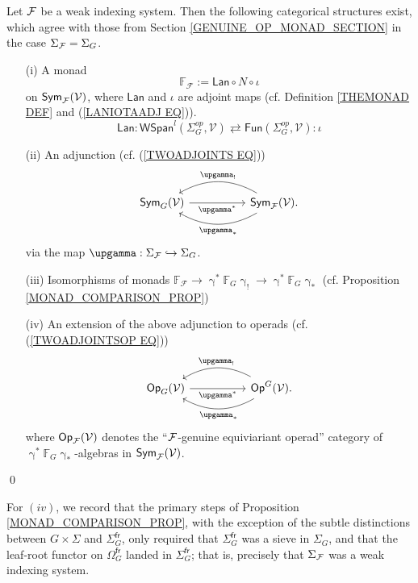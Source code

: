 \documentclass[a4paper,10pt]{article}%
\begin{document}
\begin{corollary} 
  Let $\mathcal F$ be a weak indexing system. Then the following categorical structures exist, which agree with those from Section \ref{GENUINE_OP_MONAD_SECTION} in the case $\Sigma_{\mathcal F} = \Sigma_G$. 
  \begin{enumerate}
  \item[(i)]  A monad 
    \[
    \mathbb F_{\mathcal F} := \mathsf{Lan} \circ N \circ \iota
    \]
    on $\mathsf{Sym}_{\mathcal F}(\mathcal V)$, where $\mathsf{Lan}$ and $\iota$ are adjoint maps (cf. Definition \ref{THEMONAD DEF} and (\ref{LANIOTAADJ EQ})).
    \[    
    \mathsf{Lan} \colon
    \mathsf{WSpan}^l(\Sigma^{op}_G, \mathcal{V})
    \rightleftarrows
    \mathsf{Fun}(\Sigma^{op}_G, \mathcal{V})
    \colon \iota
    \]
  \item[(ii)] An adjunction (cf. (\ref{TWOADJOINTS EQ}))
    \[
    \begin{tikzcd}[column sep =5em]
      \mathsf{Sym}_G(\mathcal{V}) \ar{r}[swap]{\upgamma^{\**}} 
      &
      \mathsf{Sym}_{\mathcal F}(\mathcal{V})
      \ar[bend right]{l}[swap,midway]{\upgamma_{!}}
      \ar[bend left]{l}{\upgamma_{\**}}.
    \end{tikzcd}
    \]
    via the map $\upgamma: \Sigma_\F \into \Sigma_G$.
\item[(iii)] Isomorphisms of monads $\mathbb F_{\mathcal F} \to \upgamma^* \mathbb F_G \upgamma_! \to \upgamma^* \mathbb F_G \upgamma_*$ (cf. Proposition \ref{MONAD_COMPARISON_PROP})

\item[(iv)] An extension of the above adjunction to operads (cf. (\ref{TWOADJOINTSOP EQ}))
  \[
  \begin{tikzcd}[column sep =5em]
    \mathsf{Op}_G(\mathcal{V}) \ar{r}[swap]{\upgamma^{\**}} 
    &
    \mathsf{Op}^G(\mathcal{V})
    \ar[bend right]{l}[swap,midway]{\upgamma_{!}}
    \ar[bend left]{l}{\upgamma_{\**}}.
  \end{tikzcd}
  \]
where $\mathsf{Op}_{\mathcal F}(\mathcal V)$ denotes the ``$\mathcal F$-genuine equiviariant operad'' category of\ $\upgamma^* \mathbb F_G \upgamma_*$-algebras in $\mathsf{Sym}_{\mathcal F}(\mathcal V)$.
\end{enumerate} \qed
\end{corollary}

\begin{remark}
  For $(iv)$, we record that the primary steps of Proposition \ref{MONAD_COMPARISON_PROP}, with the exception of the subtle distinctions between $G\times \Sigma$ and $\Sigma_G^{\mathsf{fr}}$, only required that $\Sigma_G^{\mathsf{fr}}$ was a sieve in $\Sigma_G$, and that the leaf-root functor on $\Omega_G^{\mathsf{fr}}$ landed in $\Sigma_G^{\mathsf{fr}}$; that is, precisely that $\Sigma_{\mathcal F}$ was a weak indexing system. 
\end{remark}
\end{document}
